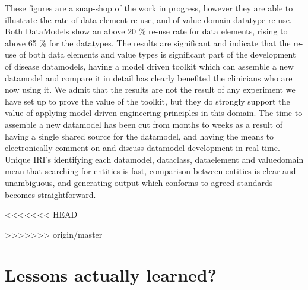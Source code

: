 These figures are a snap-shop of the work in progress, however they are able to illustrate the rate of data element re-use, and of value domain datatype re-use. Both DataModels show an above 20 \% re-use rate for data elements, rising to above 65 \% for the datatypes. The results are significant and indicate that the re-use of both data elements and value types is significant part of the development of disease datamodels, having a model driven toolkit which can assemble a new datamodel and compare it in detail has clearly benefited the clinicians who are now using it.  We admit that the results are not the result of any experiment we have set up to prove the value of the toolkit, but they do strongly support the value of applying model-driven engineering principles in this domain. The time to assemble a new datamodel has been cut from months to weeks as a result of having a single shared source for the datamodel, and having the means to electronically comment on and discuss datamodel development in real time. Unique IRI's identifying each datamodel, dataclass, dataelement and valuedomain mean that searching for entities is fast, comparison between entities is clear and unambiguous, and generating output which conforms to agreed standards becomes straightforward.



<<<<<<< HEAD
=======



>>>>>>> origin/master
\section{Lessons actually learned?}

